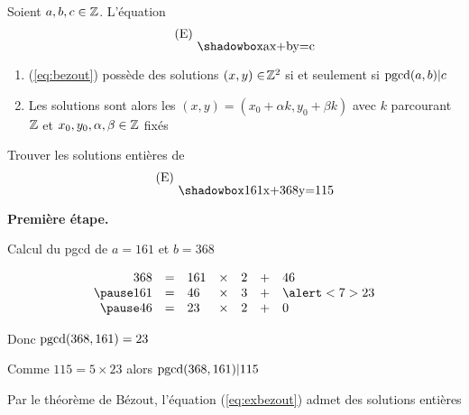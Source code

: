 \label{ssec:dioph}

\begin{frame}

\begin{proposition}
\label{prop:dioph}
Soient $a,b,c \in \mathbb{Z}$. L'équation
\begin{equation}
\label{eq:bezout}
\tag{E}
\myboxinline{ax+by=c}
\end{equation}
\pause
\begin{enumerate}
  \item (\ref{eq:bezout}) possède des solutions $(x,y)\in\! \mathbb{Z}^2$ si et seulement si
$\mathop{\text{pgcd}}\nolimits(a,b) | c$

\pause

  \item Les solutions sont alors les 
$(x,y) = (x_0+ \alpha k, y_0 + \beta k)$ avec $k$ parcourant $\mathbb{Z}$ et $x_0,y_0,\alpha,\beta \in \mathbb{Z}$ fixés
\end{enumerate}
\end{proposition}
\end{frame}


\begin{frame}

\begin{exemple}
Trouver les solutions entières de 
\vspace*{-1ex}
\begin{equation}
\label{eq:exbezout}
\tag{E}
\myboxinline{161x+368y=115}
\end{equation}
\end{exemple}

\pause
\medskip

\textbf{Première étape.} 

\pause

Calcul du pgcd de $a=161$ et $b=368$

\pause

$$
\begin{array}{rclclcl}
368 & = & 161 & \times & 2 & + & 46 \\ 
\pause
161 & = & 46 & \times & 3 & + & \alert<7>{23} \\
\pause
46  & = & 23   & \times & 2 & + & 0 \\
\end{array}
$$

\pause
Donc $\mathop{\text{pgcd}}\nolimits(368,161)=23$

\pause
\medskip

Comme $115=5\times23$ alors $\mathop{\text{pgcd}}\nolimits(368,161) | 115$

\pause

Par le théorème de Bézout, l'équation (\ref{eq:exbezout}) admet des solutions entières


\end{frame}



